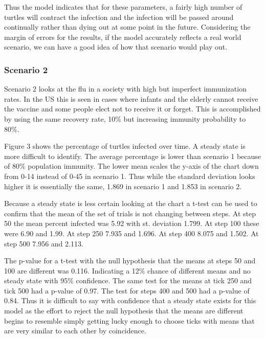 \documentclass[11pt]{article} %
\begin{document}

Thus the model indicates that for these parameters, a fairly high number of turtles will contract the infection and the infection will be passed around continually rather than dying out at some point in the future. Considering the margin of errors for the results, if the model accurately reflects a real world scenario, we can have a good idea of how that scenario would play out. 

\subsubsection{Scenario 2}

Scenario 2 looks at the flu in a society with high but imperfect immunization rates. In the US this is seen in cases where infants and the elderly cannot receive the vaccine and some people elect not to receive it or forget. This is accomplished by using the same recovery rate, 10\% but increasing immunity probability to 80\%. 



 Figure 3 shows the percentage of turtles infected over time. A steady state is more difficult to identify. The average percentage is lower than scenario 1 because of 80\% population immunity. The lower mean scales the y-axis of the chart down from 0-14 instead of 0-45 in scenario 1. Thus while the standard deviation looks higher it is essentially the same, 1.869 in scenario 1 and 1.853 in scenario 2. 

Because a steady state is less certain looking at the chart a t-test can be used to confirm that the mean of the set of trials is not changing between steps. At step 50 the mean percent infected was 5.92 with st. deviation 1.799. At step 100 these were 6.90 and 1.99. At step 250 7.935 and 1.696. At step 400 8.075 and 1.502. At step 500 7.956 and 2.113. 

The p-value for a t-test with the null hypothesis that the means at steps 50 and 100 are different was 0.116. Indicating a 12\% chance of different means and no steady state with 95\% confidence. The same test for the means at tick 250 and tick 500 had a p-value of 0.97. The test for steps 400 and 500 had a p-value of 0.84. Thus it is difficult to say with confidence that a steady state exists for this model as the effort to reject the null hypothesis that the means are different begins to resemble simply getting lucky enough to choose ticks with means that are very similar to each other by coincidence. 
\end{document}
